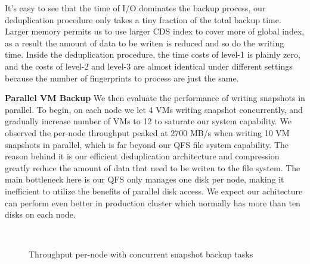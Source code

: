 It's easy to see that the time of I/O dominates the backup process, our deduplication
procedure only takes a tiny fraction of the total backup time. Larger memory permits us to
use larger CDS index to cover more of global index, as a result the amount of data to be writen
is reduced and so do the writing time.
Inside the deduplication procedure, the time costs of level-1
is plainly zero, and the costs of level-2 and level-3 are almost identical under different settings
because the number of fingerprints to process are just the same.

{\bf Parallel VM Backup} We then evaluate the performance of writing snapshots in parallel.
To begin, on each node we let 4 VMs writing snapshot concurrently, and gradually 
increase number of VMs to 12 to saturate our system capability. We observed 
the per-node throughput peaked at 2700 MB/s when writing 10 VM snapshots in parallel, 
which is far beyond our QFS file system capability. The reason behind it is our efficient
deduplication architecture and compression greatly reduce the amount of data that need to be writen to
the file system. The main bottleneck here is our QFS only manages one disk per node, 
making it inefficient to utilize the benefits of parallel disk access. We expect our achitecture can
perform even better in production cluster which normally has more than ten disks on each node.

\begin{figure}
    \centering
    \\
    \caption{Throughput per-node with concurrent snapshot backup tasks}
    \label{fig:parallel_backup}
\end{figure}


